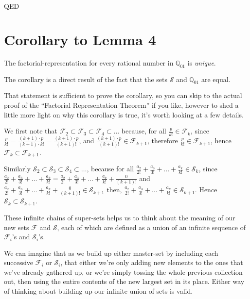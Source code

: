 \documentclass{article}
\begin{document}
\hspace*{\fill}QED

\section*{Corollary to Lemma 4}

The factorial-representation for every rational number in \(\mathbb{Q}_{01}\) is \emph{unique}.

The corollary is a direct result of the fact that
the sets \(\mathcal{S}\) and \(\mathbb{Q}_{01}\) are equal.

That statement is sufficient to prove the corollary, so you can skip to
the actual proof of the ``Factorial Representation Theorem'' if you like, however
to shed a little more light on why this corollary is true, it's worth looking at a few details.

We first note that
\(\mathcal{F}_2
\subset \mathcal{F}_3
\subset \mathcal{F}_4
\subset \dots{}\) because,
for all \(\frac{p}{k!} \in \mathcal{F}_k\),
since \(\frac{p}{k!} = \frac{(k+1)\cdot{}p}{(k+1)\cdot{}k!} = \frac{(k+1)\cdot{}p}{(k+1)!}\),
and \(\frac{(k+1)\cdot{}p}{(k+1)!} \in \mathcal{F}_{k+1}\),
therefore \(\frac{p}{k!} \in \mathcal{F}_{k+1}\),
hence \(\mathcal{F}_k \subset \mathcal{F}_{k+1}\).

Similarly
\(\mathcal{S}_2
\subset \mathcal{S}_3
\subset \mathcal{S}_4
\subset \dots{}\), because
for all \(\frac{a_2}{2!}\!+\!\frac{a_3}{3!}\!+\!\dots{}\!+\!\frac{a_k}{k!} \in \mathcal{S}_k\),
since\newline
\(\frac{a_2}{2!}\!+\!\frac{a_3}{3!}\!+\!\dots{}\!+\!\frac{a_k}{k!} =
\frac{a_2}{2!}\!+\!\frac{a_3}{3!}\!+\!\dots{}\!+\!\frac{a_k}{k!}\!+\!\frac{0}{(k+1)!}\)
and
\(\frac{a_2}{2!}\!+\!\frac{a_3}{3!}\!+\!\dots{}\!+\!\frac{a_k}{k!}\!+\!\frac{0}{(k+1)!}
\in \mathcal{S}_{k+1}\) then,\newline
\(\frac{a_2}{2!}\!+\!\frac{a_3}{3!}\!+\!\dots{}\!+\!\frac{a_k}{k!}
\in \mathcal{S}_{k+1}\). Hence 
\(\mathcal{S}_k \subset \mathcal{S}_{k+1}\).

These infinite chains of super-sets helps us to think about the
meaning of our new sets
\(\mathcal{F}\) and \(\mathcal{S}\), each of which are defined as a union of 
an infinite sequence of \(\mathcal{F}_i\)'s and \(\mathcal{S}_i\)'s.

We can imagine that as
we build up either master-set by including each successive
\(\mathcal{F}_i\) or \(\mathcal{S}_i\), that either we're only adding
new elements to the ones that we've already gathered up, or we're simply tossing
the whole previous collection out, then using the entire contents of
the new largest set in its place. Either way of thinking about
building up our infinite union of sets is valid.
\end{document}

